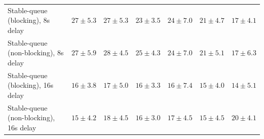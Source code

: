 \begin{table}[H]
{\begin{tabular}{l w{c}{5.0em} w{c}{5.0em} w{c}{5.0em} w{c}{5.0em} w{c}{5.0em} w{c}{5.0em}}
Stable-queue (blocking), 8s delay & $27\pm5.3$ & $27\pm5.3$ & $23\pm3.5$ & $24\pm7.0$ & $21\pm4.7$ & $17\pm4.1$ \\
Stable-queue (non-blocking), 8s delay & $27\pm5.9$ & $28\pm4.5$ & $25\pm4.3$ & $24\pm7.0$ & $21\pm5.1$ & $17\pm6.3$ \\
Stable-queue (blocking), 16s delay & $16\pm3.8$ & $17\pm5.0$ & $16\pm3.3$ & $16\pm7.4$ & $15\pm4.0$ & $14\pm5.1$ \\
Stable-queue (non-blocking), 16s delay & $15\pm4.2$ & $18\pm4.5$ & $16\pm3.0$ & $17\pm4.5$ & $15\pm4.5$ & $20\pm4.1$ \\
\bottomrule
\end{tabular}%
}
\end{table}
